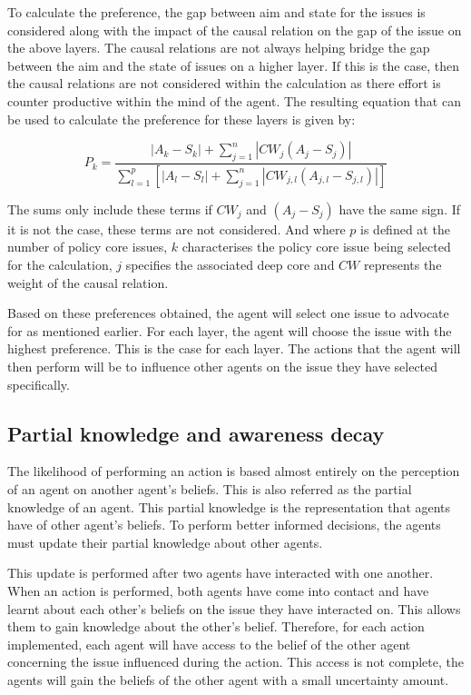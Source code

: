 To calculate the preference, the gap between aim and state for the issues is considered along with the impact of the causal relation on the gap of the issue on the above layers. The causal relations are not always helping bridge the gap between the aim and the state of issues on a higher layer. If this is the case, then the causal relations are not considered within the calculation as there effort is counter productive within the mind of the agent. The resulting equation that can be used to calculate the preference for these layers is given by:

\begin{equation}\label{eq:preference2}
P_k= \frac{ |A_k - S_k| + \sum_{j=1}^n |CW_j \left( A_j - S_j \right)|}{\sum_{l=1}^p \left[ |A_l - S_l| + \sum_{j=1}^n \left|CW_{j,l} \left( A_{j,l} - S_{j,l} \right) \right| \right]}
\end{equation}

The sums only include these terms if $CW_j$ and $\left( A_j - S_j \right)$ have the same sign. If it is not the case, these terms are not considered. And where $p$ is defined at the number of policy core issues, $k$ characterises the policy core issue being selected for the calculation, $j$ specifies the associated deep core and $CW$ represents the weight of the causal relation.

Based on these preferences obtained, the agent will select one issue to advocate for as mentioned earlier. For each layer, the agent will choose the issue with the highest preference. This is the case for each layer. The actions that the agent will then perform will be to influence other agents on the issue they have selected specifically.

\subsection{Partial knowledge and awareness decay}

The likelihood of performing an action is based almost entirely on the perception of an agent on another agent’s beliefs. This is also referred as the partial knowledge of an agent. This partial knowledge is the representation that agents have of other agent’s beliefs. To perform better informed decisions, the agents must update their partial knowledge about other agents.

This update is performed after two agents have interacted with one another. When an action is performed, both agents have come into contact and have learnt about each other’s beliefs on the issue they have interacted on. This allows them to gain knowledge about the other’s belief. Therefore, for each action implemented, each agent will have access to the belief of the other agent concerning the issue influenced during the action. This access is not complete, the agents will gain the beliefs of the other agent with a small uncertainty amount.

